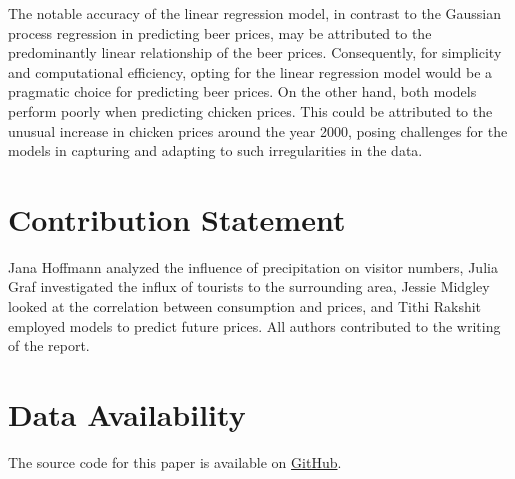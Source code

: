 \documentclass{article}
\theoremstyle{plain}
\theoremstyle{definition}
\theoremstyle{remark}
\begin{document}
The notable accuracy of the linear regression model, in contrast to the Gaussian process regression in predicting beer prices, may be attributed to the predominantly linear relationship of the beer prices. Consequently, for simplicity and computational efficiency, opting for the linear regression model would be a pragmatic choice for predicting beer prices. On the other hand, both models perform poorly when predicting chicken prices. This could be attributed to the unusual increase in chicken prices around the year 2000, posing challenges for the models in capturing and adapting to such irregularities in the data.\\


\section*{Contribution Statement}
Jana Hoffmann analyzed the influence of precipitation on visitor numbers, Julia Graf investigated the influx of tourists to the surrounding area, Jessie Midgley looked at the correlation between consumption and prices, and Tithi Rakshit employed models to predict future prices. All authors contributed to the writing of the report.

\section*{Data Availability}
The source code for this paper is available on \href{{https://github.com/JuliaGraf/Data-Literacy-Report}}{GitHub}.



\end{document}
